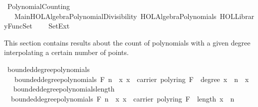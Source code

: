 %
\begin{isabellebody}%
%
%
\isadelimdocument
%
\endisadelimdocument
%
\isatagdocument
%
\isamarkuptrue%
%
\endisatagdocument
{\isafolddocument}%
%
\isadelimdocument
%
\endisadelimdocument
%
\isadelimtheory
%
\endisadelimtheory
%
\isatagtheory
{}\isamarkupfalse%
\ PolynomialCounting\isanewline
\ \ \ Main{\isachardoublequoteopen}HOL{\isacharminus}{\kern0pt}Algebra{\isachardot}{\kern0pt}Polynomial{\isacharunderscore}{\kern0pt}Divisibility{\isachardoublequoteclose}\ {\isachardoublequoteopen}HOL{\isacharminus}{\kern0pt}Algebra{\isachardot}{\kern0pt}Polynomials{\isachardoublequoteclose}\ {\isachardoublequoteopen}HOL{\isacharminus}{\kern0pt}Library{\isachardot}{\kern0pt}FuncSet{\isachardoublequoteclose}\isanewline
\ \ \ \ Set{\isacharunderscore}{\kern0pt}Ext\ \isanewline
{}%
\endisatagtheory
{\isafoldtheory}%
%
\isadelimtheory
%
\endisadelimtheory
%
\begin{isamarkuptext}%
This section contains results about the count of polynomials with a given degree interpolating
a certain number of points.%
\end{isamarkuptext}\isamarkuptrue%
\isamarkupfalse%
\ bounded{\isacharunderscore}{\kern0pt}degree{\isacharunderscore}{\kern0pt}polynomials\isanewline
\ \ \ {\isachardoublequoteopen}bounded{\isacharunderscore}{\kern0pt}degree{\isacharunderscore}{\kern0pt}polynomials\ F\ n\ {\isacharequal}{\kern0pt}\ {\isacharbraceleft}{\kern0pt}x{\isachardot}{\kern0pt}\ x\ {\isasymin}\ carrier\ {\isacharparenleft}{\kern0pt}poly{\isacharunderscore}{\kern0pt}ring\ F{\isacharparenright}{\kern0pt}\ {\isasymand}\ {\isacharparenleft}{\kern0pt}degree\ x\ {\isacharless}{\kern0pt}\ n\ {\isasymor}\ x\ {\isacharequal}{\kern0pt}\ {\isacharbrackleft}{\kern0pt}{\isacharbrackright}{\kern0pt}{\isacharparenright}{\kern0pt}{\isacharbraceright}{\kern0pt}{\isachardoublequoteclose}\isanewline
\isanewline
{}\isamarkupfalse%
\ bounded{\isacharunderscore}{\kern0pt}degree{\isacharunderscore}{\kern0pt}polynomials{\isacharunderscore}{\kern0pt}length{\isacharcolon}{\kern0pt}\isanewline
\ \ {\isachardoublequoteopen}bounded{\isacharunderscore}{\kern0pt}degree{\isacharunderscore}{\kern0pt}polynomials\ F\ n\ {\isacharequal}{\kern0pt}\ {\isacharbraceleft}{\kern0pt}x{\isachardot}{\kern0pt}\ x\ {\isasymin}\ carrier\ {\isacharparenleft}{\kern0pt}poly{\isacharunderscore}{\kern0pt}ring\ F{\isacharparenright}{\kern0pt}\ {\isasymand}\ length\ x\ {\isasymle}\ n{\isacharbraceright}{\kern0pt}{\isachardoublequoteclose}\isanewline

\end{isabellebody}

